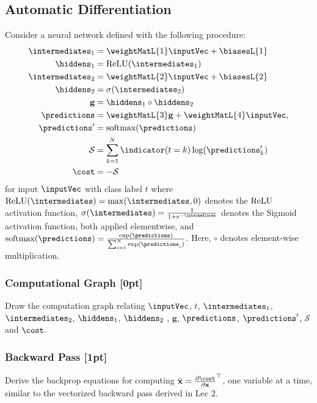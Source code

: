 \subsection{Automatic Differentiation}
Consider a neural network defined with the following procedure:
\begin{align*}
    \intermediates_1 &= \weightMatL{1} \inputVec + \biasesL{1} \\
    \hiddens_1 &= \textnormal{ReLU}(\intermediates_1) \\
    \intermediates_2 &= \weightMatL{2} \inputVec + \biasesL{2} \\
    \hiddens_2 &= \sigma(\intermediates_2) \\
    \mathbf{g} &= \hiddens_1 \circ \hiddens_2 \\
    \predictions &=  \weightMatL{3} \mathbf{g} + \weightMatL{4} \inputVec,\\
    \predictions' &= \textnormal{softmax}(\predictions)\\ 
    \mathcal{S} &= \sum_{k=1}^{N}\indicator(t = k)\log(\predictions'_{k})\\
    \cost &= -\mathcal{S}
\end{align*}
for input $\inputVec$ with class label $t$ where $\textnormal{ReLU}(\intermediates) = \max(\intermediates, 0)$ denotes the $\textnormal{ReLU}$ activation function, $\sigma(\intermediates) = \frac{1}{1+e^{-\intermediates}}$ denotes the Sigmoid activation function, both applied elementwise, and $\textnormal{softmax}(\predictions) = \frac{\exp(\predictions)}{\sum_{i = 1}^{N}\exp(\predictions_i)}$.
Here, $\circ$ denotes element-wise multiplication. 

\subsubsection{Computational Graph {[0pt]} \LIV}
    Draw the computation graph relating $\inputVec$, $t$, $\intermediates_1$, $\intermediates_2$, $\hiddens_1$, $\hiddens_2$ , $\mathbf{g}$, $\predictions$, $\predictions'$, $\mathcal{S}$ and $\cost$.

\subsubsection{Backward Pass {\color{blue}[1pt]} \LIII}
    Derive the backprop equations for computing $\Bar{\mathbf{x}} = {\frac{\partial \cost}{\partial \mathbf{x}}}^{\top}$, one variable at a time, similar to the vectorized backward pass derived in Lec 2. \\
    

